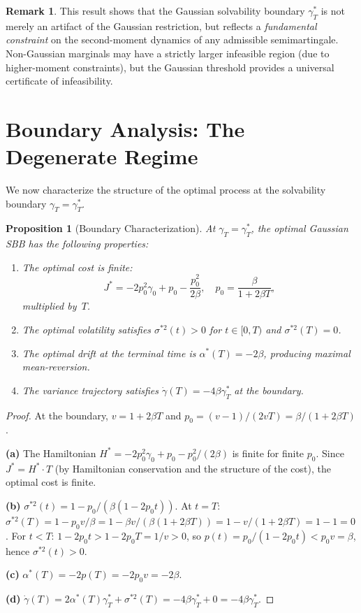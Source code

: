 \documentclass[12pt]{article}
\newtheorem{proposition}[theorem]{Proposition}
\theoremstyle{definition}
\newtheorem{remark}[theorem]{Remark}
\begin{document}
\begin{remark}
This result shows that the Gaussian solvability boundary $\gamma_T^*$
is not merely an artifact of the Gaussian restriction, but reflects a
\emph{fundamental constraint} on the second-moment dynamics of any
admissible semimartingale.
Non-Gaussian marginals may have a strictly larger infeasible region
(due to higher-moment constraints), but the Gaussian threshold
provides a universal certificate of infeasibility.
\end{remark}

\section{Boundary Analysis: The Degenerate Regime}\label{sec:boundary}

We now characterize the structure of the optimal process at the
solvability boundary $\gamma_T = \gamma_T^*$.

\begin{proposition}[Boundary Characterization]\label{prop:boundary}
At $\gamma_T = \gamma_T^*$, the optimal Gaussian SBB has the following
properties:
\begin{enumerate}[label=(\alph*)]
\item The optimal cost is \emph{finite}:
\[
J^* = -2p_0^2\gamma_0 + p_0 - \frac{p_0^2}{2\beta},
\quad p_0 = \frac{\beta}{1 + 2\beta T},
\]
multiplied by~$T$.
\item The optimal volatility satisfies
$\sigma^{*2}(t) > 0$ for $t \in [0, T)$ and $\sigma^{*2}(T) = 0$.
\item The optimal drift at the terminal time is
$\alpha^*(T) = -2\beta$, producing maximal mean-reversion.
\item The variance trajectory satisfies
$\dot\gamma(T) = -4\beta\gamma_T^*$ at the boundary.
\end{enumerate}
\end{proposition}

\begin{proof}
At the boundary, $v = 1 + 2\beta T$ and
$p_0 = (v-1)/(2vT) = \beta/(1+2\beta T)$.

\medskip\noindent
\textbf{(a)}
The Hamiltonian $H^* = -2p_0^2\gamma_0 + p_0 - p_0^2/(2\beta)$
is finite for finite $p_0$.
Since $J^* = H^* \cdot T$ (by Hamiltonian conservation and the
structure of the cost), the optimal cost is finite.

\medskip\noindent
\textbf{(b)}
$\sigma^{*2}(t) = 1 - p_0/(\beta(1-2p_0t))$.
At $t = T$: $\sigma^{*2}(T) = 1 - p_0 v/\beta
= 1 - \beta v/(\beta(1+2\beta T)) = 1 - v/(1+2\beta T) = 1 - 1 = 0$.
For $t < T$: $1 - 2p_0 t > 1 - 2p_0 T = 1/v > 0$,
so $p(t) = p_0/(1-2p_0t) < p_0 v = \beta$,
hence $\sigma^{*2}(t) > 0$.

\medskip\noindent
\textbf{(c)}
$\alpha^*(T) = -2p(T) = -2p_0 v = -2\beta$.

\medskip\noindent
\textbf{(d)}
$\dot\gamma(T) = 2\alpha^*(T)\gamma_T^* + \sigma^{*2}(T)
= -4\beta\gamma_T^* + 0 = -4\beta\gamma_T^*$.
\end{proof}
\end{document}
